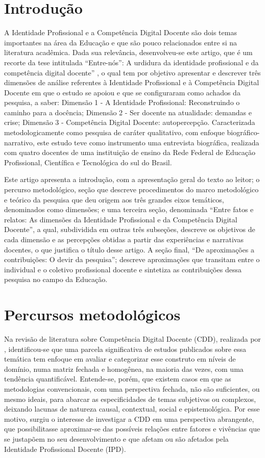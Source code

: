 \documentclass[portuguese]{textolivre}
\begin{document}
\section{Introdução}
A Identidade Profissional e a Competência Digital Docente são dois temas importantes na área da Educação e que são pouco relacionados entre si na literatura acadêmica. Dada sua relevância, desenvolveu-se este artigo, que é um recorte da tese intitulada “Entre-nós”: A urdidura da identidade profissional e da competência digital docente” \cite{paz2023}, o qual tem por objetivo apresentar e descrever três dimensões de análise referentes à Identidade Profissional e à Competência Digital Docente em que o estudo se apoiou e que se configuraram como achados da pesquisa, a saber: Dimensão 1 - A Identidade Profissional: Reconstruindo o caminho para a docência; Dimensão 2 - Ser docente na atualidade: demandas e crise; Dimensão 3 - Competência Digital Docente: autopercepção. Caracterizada metodologicamente como pesquisa de caráter qualitativo, com enfoque biográfico-narrativo, este estudo teve como instrumento uma entrevista biográfica, realizada com quatro docentes de uma instituição de ensino da Rede Federal de Educação Profissional, Científica e Tecnológica do sul do Brasil.

Este artigo apresenta a introdução, com a apresentação geral do texto ao leitor; o percurso metodológico, seção que descreve procedimentos do marco metodológico e teórico da pesquisa que deu origem aos três grandes eixos temáticos, denominados como dimensões; e uma terceira seção, denominada “Entre fatos e relatos: As dimensões da Identidade Profissional e da Competência Digital Docente”, a qual, subdividida em outras três subseções, descreve os objetivos de cada dimensão e as percepções obtidas a partir das experiências e narrativas docentes, o que justifica o título desse artigo. A seção final, “De aproximações a contribuições: O devir da pesquisa”; descreve aproximações que transitam entre o individual e o coletivo profissional docente e sintetiza as contribuições dessa pesquisa no campo da Educação.

\section{Percursos metodológicos}\label{sec-normas}
Na revisão de literatura sobre Competência Digital Docente (CDD), realizada por \textcite{paz2022}, identificou-se que uma parcela significativa de estudos publicados sobre essa temática tem enfoque em avaliar e categorizar esse construto em níveis de domínio, numa matriz fechada e homogênea, na maioria das vezes, com uma tendência quantificável. Entende-se, porém, que existem casos em que as metodologias convencionais, com uma perspectiva fechada, não são suficientes, ou mesmo ideais, para abarcar as especificidades de temas subjetivos ou complexos, deixando lacunas de natureza causal, contextual, social e epistemológica. Por esse motivo, surgiu o interesse de investigar a CDD em uma perspectiva abrangente, que possibilitasse aproximar-se das possíveis relações entre fatores e vivências que se justapõem no seu desenvolvimento e que afetam ou são afetados pela Identidade Profissional Docente (IPD).
\end{document}
